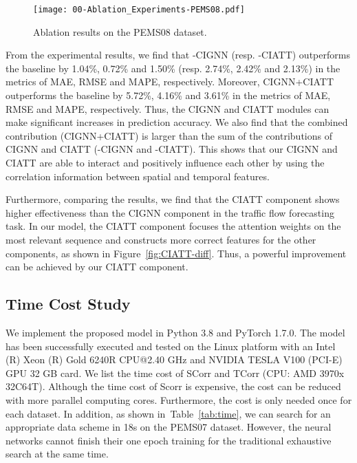\documentclass[sn-mathphys,iicol]{sn-jnl}
\newcommand\figref[1]{Figure~\ref{#1}}
\newcommand\tabref[1]{Table~\ref{#1}}
\theoremstyle{thmstyleone}\newtheorem{theorem}{Theorem}\newtheorem{proposition}[theorem]{Proposition}
\theoremstyle{thmstyletwo}\newtheorem{example}{Example}\newtheorem{remark}{Remark}
\theoremstyle{thmstylethree}\newtheorem{definition}{Definition}
\begin{document}
\begin{figure}[!h]
\centering
\texttt{[image: 00-Ablation\_Experiments-PEMS08.pdf]}
\caption{Ablation results on the PEMS08 dataset.}
\label{fig:pems08}
\end{figure}

From the experimental results, we find that -CIGNN (resp. -CIATT) outperforms the baseline by 1.04\%, 0.72\% and 1.50\% (resp. 2.74\%, 2.42\% and 2.13\%) in the metrics of MAE, RMSE and MAPE, respectively. Moreover, CIGNN+CIATT outperforms the baseline by 5.72\%, 4.16\% and 3.61\% in the metrics of MAE, RMSE and MAPE, respectively. Thus, the CIGNN and CIATT modules can make significant increases in prediction accuracy. We also find that the combined contribution (CIGNN+CIATT) is larger than the sum of the contributions of CIGNN and CIATT (-CIGNN and -CIATT). This shows that our CIGNN and CIATT are able to interact and positively influence each other by using the correlation information between spatial and temporal features.







Furthermore, comparing the results, we find that the CIATT component shows higher effectiveness than the CIGNN component in the traffic flow forecasting task. In our model, the CIATT component focuses the attention weights on the most relevant sequence and constructs more correct features for the other components, as shown in \figref{fig:CIATT-diff}. Thus, a powerful improvement can be achieved by our CIATT component.

\subsection{Time Cost Study}
We implement the proposed model in Python 3.8 and PyTorch 1.7.0. The model has been successfully executed and tested on the Linux platform with an Intel (R) Xeon (R) Gold 6240R CPU@2.40 GHz and NVIDIA TESLA V100 (PCI-E) GPU 32 GB card. We list the time cost of SCorr and TCorr (CPU: AMD 3970x 32C64T). Although the time cost of Scorr is expensive, the cost can be reduced with more parallel computing cores. Furthermore, the cost is only needed once for each dataset. In addition, as shown in~\tabref{tab:time}, we can search for an appropriate data scheme in 18s on the PEMS07 dataset. However, the neural networks cannot finish their one epoch training for the traditional exhaustive search at the same time.
\end{document}
